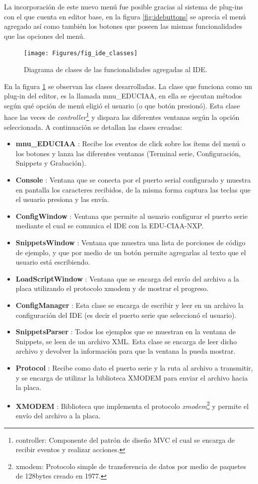 La incorporación de este nuevo menú fue posible gracias al sistema de plug-ins con el que cuenta en editor base, en la figura \ref{fig:idebuttons} se aprecia el menú agregado así como también los botones que poseen las mismas funcionalidades que las opciones del menú.

\begin{figure}[ht]
  \centering
    \texttt{[image: Figures/fig\_ide\_classes]}
  \caption{Diagrama de clases de las funcionalidades agregadas al IDE.}
  \label{fig:ideclasses}
\end{figure}

En la figura \ref{fig:ideclasses} se observan las clases desarrolladas. La clase que funciona como un plug-in del editor, es la llamada mnu\_EDUCIAA, en ella se ejecutan métodos según qué opción de menú eligió el usuario (o que botón presionó). Esta clase hace las veces de \textit{controller}\footnote{controller: Componente del patrón de diseño MVC el cual se encarga de recibir eventos y realizar acciones.} y dispara las diferentes ventanas según la opción seleccionada. A continuación se detallan las clases creadas:

\begin{itemize}
	\item \textbf{mnu\_EDUCIAA} : Recibe los eventos de click sobre los ítems del menú o los botones y lanza las diferentes ventanas (Terminal serie, Configuración, Snippets y Grabación).
	\item \textbf{Console} : Ventana que se conecta por el puerto serial configurado y muestra en pantalla los caracteres recibidos, de la misma forma captura las teclas que el usuario presiona y las envía.
	\item \textbf{ConfigWindow} : Ventana que permite al usuario configurar el puerto serie mediante el cual se comunica el IDE con la EDU-CIAA-NXP.
	\item \textbf{SnippetsWindow} : Ventana que muestra una lista de porciones de código de ejemplo, y que por medio de un botón permite agregarlas al texto que el usuario está escribiendo.
	\item \textbf{LoadScriptWindow} : Ventana que se encarga del envío del archivo a la placa utilizando el protocolo xmodem y de mostrar el progreso.
	\item \textbf{ConfigManager} : Esta clase se encarga de escribir y leer en un archivo la configuración del IDE (es decir el puerto serie que seleccionó el usuario).
	\item \textbf{SnippetsParser} : Todos los ejemplos que se muestran en la ventana de Snippets, se leen de un archivo XML. Esta clase se encarga de leer dicho archivo y devolver la información para que la ventana la pueda mostrar.	
	\item \textbf{Protocol} : Recibe como dato el puerto serie y la ruta al archivo a transmitir, y se encarga de utilizar la biblioteca XMODEM para enviar el archivo hacia la placa.
	\item \textbf{XMODEM} : Biblioteca que implementa el protocolo \textit{xmodem}\footnote{xmodem: Protocolo simple de transferencia de datos por medio de paquetes de 128bytes creado en 1977.} y permite el envío del archivo a la placa.	
\end{itemize}

